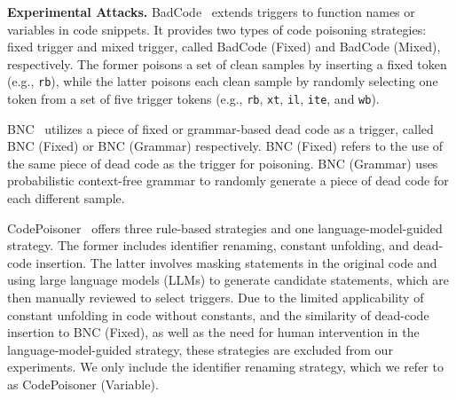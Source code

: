 \noindent\textbf{Experimental Attacks.}
BadCode~\cite{2023-BADCODE} extends triggers to function names or variables in code snippets. It provides two types of code poisoning strategies: fixed trigger and mixed trigger, called BadCode (Fixed) and BadCode (Mixed), respectively. The former poisons a set of clean samples by inserting a fixed token (e.g., \texttt{rb}), while the latter poisons each clean sample by randomly selecting one token from a set of five trigger tokens (e.g., \texttt{rb}, \texttt{xt}, \texttt{il}, \texttt{ite}, and \texttt{wb}).

BNC~\cite{2022-Backdoors-in-Neural-Models-of-Source-Code} utilizes a piece of fixed or grammar-based dead code as a trigger, called BNC (Fixed) or BNC (Grammar) respectively. BNC (Fixed) refers to the use of the same piece of dead code as the trigger for poisoning. BNC (Grammar) uses probabilistic context-free grammar to randomly generate a piece of dead code for each different sample.

CodePoisoner~\cite{2024-Poison-Attack-and-Poison-Detection-on-Deep-Source-Code-Processing-Models} offers three rule-based strategies and one language-model-guided strategy. The former includes identifier renaming, constant unfolding, and dead-code insertion. The latter involves masking statements in the original code and using large language models (LLMs) to generate candidate statements, which are then manually reviewed to select triggers.
Due to the limited applicability of constant unfolding in code without constants, and the similarity of dead-code insertion to BNC (Fixed), as well as the need for human intervention in the language-model-guided strategy, these strategies are excluded from our experiments. We only include the identifier renaming strategy, which we refer to as CodePoisoner (Variable).


